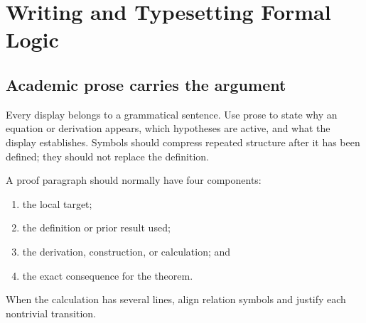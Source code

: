\chapter{Writing and Typesetting Formal Logic}
\label{ch:latex-style}

\section{Academic prose carries the argument}
\label{sec:latex-style-01}

Every display belongs to a grammatical sentence.  Use prose to state why an
equation or derivation appears, which hypotheses are active, and what the
display establishes.  Symbols should compress repeated structure after it has
been defined; they should not replace the definition.

\begin{method}
A proof paragraph should normally have four components:
\begin{enumerate}
  \item the local target;
  \item the definition or prior result used;
  \item the derivation, construction, or calculation; and
  \item the exact consequence for the theorem.
\end{enumerate}
When the calculation has several lines, align relation symbols and justify each
nontrivial transition.
\end{method}

